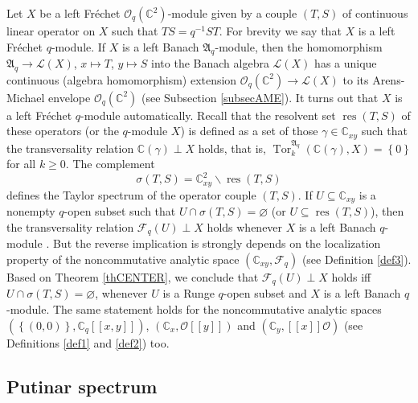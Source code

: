 \documentclass[12pt,reqno]{amsart}%
\theoremstyle{plain}
\numberwithin{theorem}{section} \numberwithin{equation}{section}
\numberwithin{lemma}{section}
\numberwithin{remark}{section}
\numberwithin{example}{section}
\numberwithin{proposition}{section}
\numberwithin{definition}{section}
\numberwithin{corollary}{section}
\begin{document}
Let $X$ be a left Fr\'{e}chet $\mathcal{O}_{q}\left(  \mathbb{C}^{2}\right)
$-module given by a couple $\left(  T,S\right)  $ of continuous linear
operator on $X$ such that $TS=q^{-1}ST$. For brevity we say that $X$ is a left
Fr\'{e}chet $q$-module. If $X$ is a left Banach $\mathfrak{A}_{q}$-module,
then the homomorphism $\mathfrak{A}_{q}\rightarrow\mathcal{L}\left(  X\right)
$, $x\mapsto T$, $y\mapsto S$ into the Banach algebra $\mathcal{L}\left(
X\right)  $ has a unique continuous (algebra homomorphism) extension
$\mathcal{O}_{q}\left(  \mathbb{C}^{2}\right)  \rightarrow\mathcal{L}\left(
X\right)  $ to its Arens-Michael envelope $\mathcal{O}_{q}\left(
\mathbb{C}^{2}\right)  $ (see Subsection \ref{subsecAME}). It turns out that
$X$ is a left Fr\'{e}chet $q$-module automatically. Recall \cite{Dosi242} that
the resolvent set $\operatorname{res}\left(  T,S\right)  $ of these operators
(or the $q$-module $X$) is defined as a set of those $\gamma\in\mathbb{C}%
_{xy}$ such that the transversality relation $\mathbb{C}\left(  \gamma\right)
\perp X$ holds, that is, $\operatorname{Tor}_{k}^{\mathfrak{A}_{q}}\left(
\mathbb{C}\left(  \gamma\right)  ,X\right)  =\left\{  0\right\}  $ for all
$k\geq0$. The complement
\[
\sigma\left(  T,S\right)  =\mathbb{C}_{xy}^{2}\backslash\operatorname{res}%
\left(  T,S\right)
\]
defines the Taylor spectrum of the operator couple $\left(  T,S\right)  $. If
$U\subseteq\mathbb{C}_{xy}$ is a nonempty $q$-open subset such that
$U\cap\sigma\left(  T,S\right)  =\varnothing$ (or $U\subseteq
\operatorname{res}\left(  T,S\right)  $), then the transversality relation
$\mathcal{F}_{q}\left(  U\right)  \perp X$ holds whenever $X$ is a left Banach
$q$-module \cite[Theorem 6.5]{Dosi25}. But the reverse implication is strongly
depends on the localization property of the noncommutative analytic space
$\left(  \mathbb{C}_{xy},\mathcal{F}_{q}\right)  $ (see Definition
\ref{def3}). Based on Theorem \ref{thCENTER}, we conclude that $\mathcal{F}%
_{q}\left(  U\right)  \perp X$ holds iff $U\cap\sigma\left(  T,S\right)
=\varnothing$, whenever $U$ is a Runge $q$-open subset and $X$ is a left
Banach $q$-module. The same statement holds for the noncommutative analytic
spaces $\left(  \left\{  \left(  0,0\right)  \right\}  ,\mathbb{C}_{q}\left[
\left[  x,y\right]  \right]  \right)  $, $\left(  \mathbb{C}_{x}%
,\mathcal{O}\left[  \left[  y\right]  \right]  \right)  $ and $\left(
\mathbb{C}_{y},\left[  \left[  x\right]  \right]  \mathcal{O}\right)  $ (see
Definitions \ref{def1} and \ref{def2}) too.

\subsection{Putinar spectrum}
\end{document}

